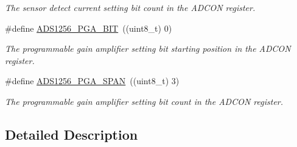 \begin{DoxyCompactItemize}
\begin{DoxyCompactList}\small\item\em The sensor detect current setting bit count in the A\-D\-C\-O\-N register. \end{DoxyCompactList}\item 
\hypertarget{group__adcon__register_ga331593eda0ade15ce934f8d2188e0f4f}{\#define \hyperlink{group__adcon__register_ga331593eda0ade15ce934f8d2188e0f4f}{A\-D\-S1256\-\_\-\-P\-G\-A\-\_\-\-B\-I\-T}~((uint8\-\_\-t) 0)}\label{group__adcon__register_ga331593eda0ade15ce934f8d2188e0f4f}

\begin{DoxyCompactList}\small\item\em The programmable gain amplifier setting bit starting position in the A\-D\-C\-O\-N register. \end{DoxyCompactList}\item 
\hypertarget{group__adcon__register_ga04102c89838c33a2da9fb44d71c9ce16}{\#define \hyperlink{group__adcon__register_ga04102c89838c33a2da9fb44d71c9ce16}{A\-D\-S1256\-\_\-\-P\-G\-A\-\_\-\-S\-P\-A\-N}~((uint8\-\_\-t) 3)}\label{group__adcon__register_ga04102c89838c33a2da9fb44d71c9ce16}

\begin{DoxyCompactList}\small\item\em The programmable gain amplifier setting bit count in the A\-D\-C\-O\-N register. \end{DoxyCompactList}\end{DoxyCompactItemize}


\subsection{Detailed Description}
